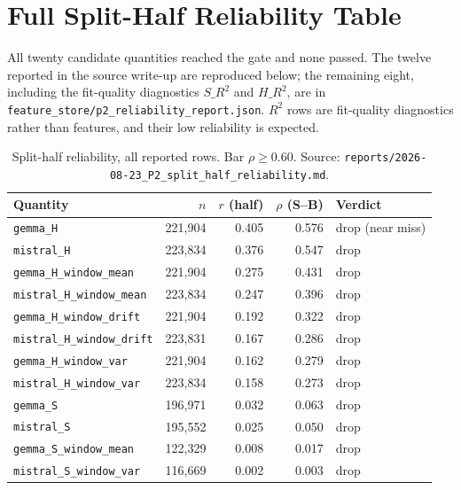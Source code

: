\documentclass{article}
\begin{document}
\section{Full Split-Half Reliability Table}
\label{app:reliability}

All twenty candidate quantities reached the gate and none passed. The twelve reported in the source write-up are reproduced below; the
remaining eight, including the fit-quality diagnostics $S\_R^2$ and $H\_R^2$,
are in \texttt{feature\_store/p2\_reliability\_report.json}. $R^2$ rows are
fit-quality diagnostics rather than features, and their low reliability is
expected.

\begin{table}[h]
\centering
\footnotesize
\caption{Split-half reliability, all reported rows. Bar $\rho\ge0.60$.
Source: \texttt{reports/2026-08-23\_P2\_split\_half\_reliability.md}.}
\label{tab:appreliability}
\begin{tabular}{lrrrl}
\toprule
Quantity & $n$ & $r$ (half) & $\rho$ (S--B) & Verdict \\
\midrule
\texttt{gemma\_H}                 & 221{,}904 & 0.405 & 0.576 & drop (near miss) \\
\texttt{mistral\_H}               & 223{,}834 & 0.376 & 0.547 & drop \\
\texttt{gemma\_H\_window\_mean}   & 221{,}904 & 0.275 & 0.431 & drop \\
\texttt{mistral\_H\_window\_mean} & 223{,}834 & 0.247 & 0.396 & drop \\
\texttt{gemma\_H\_window\_drift}  & 221{,}904 & 0.192 & 0.322 & drop \\
\texttt{mistral\_H\_window\_drift}& 223{,}831 & 0.167 & 0.286 & drop \\
\texttt{gemma\_H\_window\_var}    & 221{,}904 & 0.162 & 0.279 & drop \\
\texttt{mistral\_H\_window\_var}  & 223{,}834 & 0.158 & 0.273 & drop \\
\texttt{gemma\_S}                 & 196{,}971 & 0.032 & 0.063 & drop \\
\texttt{mistral\_S}               & 195{,}552 & 0.025 & 0.050 & drop \\
\texttt{gemma\_S\_window\_mean}   & 122{,}329 & 0.008 & 0.017 & drop \\
\texttt{mistral\_S\_window\_var}  & 116{,}669 & 0.002 & 0.003 & drop \\
\bottomrule
\end{tabular}
\end{table}
\end{document}
